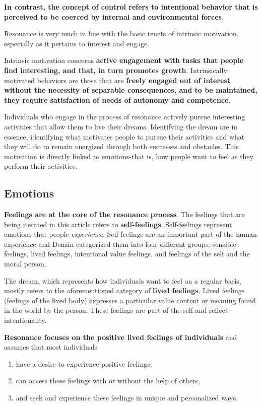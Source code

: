 \documentclass[ebook,12pt,oneside,openany]{memoir}
\begin{document}
\textbf{In contrast, the concept of control refers to intentional behavior that is perceived to be coerced by internal and environmental forces}.

Resonance is very much in line with the basic tenets of intrinsic motivation, especially as it pertains to interest and engage.

Intrinsic motivation concerns \textbf{active engagement with tasks that people find interesting, and that, in turn promotes growth}.
Intrinsically motivated behaviors are those that are \textbf{freely engaged out of interest without the necessity of separable consequences, and to be maintained, 
they require satisfaction of needs of autonomy and competence}.

Individuals who engage in the process of resonance actively pursue interesting activities that allow them to live their dreams.
Identifying the dream are in essence, identifying what motivates people to pursue their activities and what they will do to remain energized through both successes and obstacles.
This motivation is directly linked to emotions-that is, how people want to feel as they perform their activities.

\subsection{Emotions}
\textbf{Feelings are at the core of the resonance process}. 
The feelings that are being iterated in this article refers to \textbf{self-feelings}.
Self-feelings represent emotions that people \textit{experience}. Self-feelings are an important part of the human experience and Denzin categorized them into four different groups:
sensible feelings, lived feelings, intentional value feelings, and feelings of the self and the moral person.

The dream, which represents how individuals want to feel on a regular basis, mostly refers to the aforementioned category of \textbf{lived feelings}.
Lived feelings (feelings of the lived body) expresses a particular value content or meaning found in the world by the person. 
These feelings are part of the self and reflect intentionality. 

\textbf{Resonance focuses on the positive lived feelings of individuals} and assumes that most individuals
\begin{enumerate}
    \item have a desire to experience positive feelings,
    \item can access these feelings with or without the help of others,
    \item and seek and experience these feelings in unique and personalized ways.
\end{enumerate}
\end{document}
